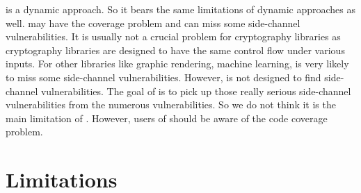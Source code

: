\ctool{} is a dynamic approach. So it bears the same limitations of dynamic approaches as well. \ctool{} may have the coverage problem and can miss some side-channel vulnerabilities. It is usually not a crucial problem for cryptography libraries as cryptography libraries are designed to have the same control flow under various inputs. For other libraries like graphic rendering, machine learning, \ctool{} is very likely to miss some side-channel vulnerabilities. However, \ctool{} is not designed to find side-channel vulnerabilities. The goal of \ctool{} is to pick up those really serious side-channel vulnerabilities from the numerous vulnerabilities. So we do not think it is the main limitation of \ctool{}. However, users of \ctool{} should be aware of the code coverage problem. 

\section{Limitations}